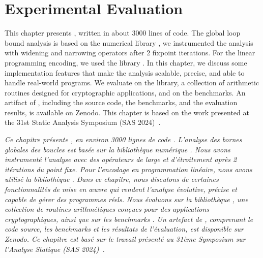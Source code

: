 \setchapterpreamble[u]{\margintoc}

\chapter{Experimental Evaluation}

This chapter presents \timesec\sidenotemark[\ref{sas24-eval:timesecurl}], written in about 3000 lines of \python{} code.
The global loop bound analysis is based on the numerical library \apron{} \cite{Jeannet2009}, we instrumented the analysis with widening and narrowing operators after 2 fixpoint iterations.
For the linear programming encoding, we used the \python{} library \scipy\sidenotemark[\ref{sas24-eval:scipy}].
In this chapter, we discuss some implementation features that make the analysis scalable, precise, and able to handle real-world programs.
We evaluate \timesec{} on the \bignum{} library, a collection of arithmetic routines designed for cryptographic applications, and on the \svcomp{} benchmarks.
An artifact of \timesec, including the source code, the benchmarks, and the evaluation results, is available on Zenodo\sidenotemark[\ref{sas24-eval:timeseczenodo}].
This chapter is based on the work presented at the 31st Static Analysis Symposium (SAS 2024)~\cite{Mazzucato2024c}.


\frenchdiv

\emph{Ce chapitre présente \timesec\sidenote{\label{sas24-eval:timesecurl}\timesecurl}, en environ 3000 lignes de code \python{}. L'analyse des bornes globales des boucles est basée sur la bibliothèque numérique \apron{} . Nous avons instrumenté l'analyse avec des opérateurs de large et d'étroitement après 2 itérations du point fixe. Pour l'encodage en programmation linéaire, nous avons utilisé la bibliothèque \python{} \scipy{}. Dans ce chapitre, nous discutons de certaines fonctionnalités de mise en œuvre qui rendent l'analyse évolutive, précise et capable de gérer des programmes réels. Nous évaluons \timesec{} sur la bibliothèque \bignum{}, une collection de routines arithmétiques conçues pour des applications cryptographiques, ainsi que sur les benchmarks \svcomp{}. Un artefact de \timesec, comprenant le code source, les benchmarks et les résultats de l'évaluation, est disponible sur Zenodo\sidenote{\label{sas24-eval:timeseczenodo}\timeseczenodo}. Ce chapitre est basé sur le travail présenté au 31ème Symposium sur l'Analyse Statique (SAS 2024)~.}

